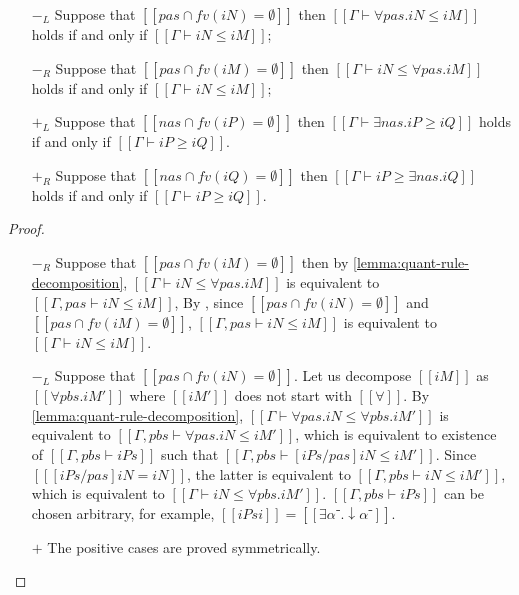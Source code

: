 \begin{corollary}
  \label{corollary:red-quant-elim}
  \hfill
  \begin{itemize}
    \item [$-_{L}$] Suppose that $[[ {pas} ∩ fv(iN) = ∅]]$ then 
      $[[Γ ⊢ ∀pas.iN ≤ iM]]$ holds if and only if $[[Γ ⊢ iN ≤ iM]]$;
    \item [$-_{R}$] Suppose that $[[ {pas} ∩ fv(iM) = ∅]]$ then 
      $[[Γ ⊢ iN ≤ ∀pas.iM]]$ holds if and only if $[[Γ ⊢ iN ≤ iM]]$;
    \item [$+_{L}$] Suppose that $[[ {nas} ∩ fv(iP) = ∅]]$ then
      $[[Γ ⊢ ∃nas.iP ≥ iQ]]$ holds if and only if $[[Γ ⊢ iP ≥ iQ]]$.
    \item [$+_{R}$] Suppose that $[[ {nas} ∩ fv(iQ) = ∅]]$ then 
      $[[Γ ⊢ iP ≥ ∃nas.iQ]]$ holds if and only if $[[Γ ⊢ iP ≥ iQ]]$.
  \end{itemize}
\end{corollary}
\begin{proof}
  \begin{itemize}
    \item [$-_{R}$] Suppose that $[[ {pas} ∩ fv(iM) = ∅]]$ then 
      by \cref{lemma:quant-rule-decomposition},
      $[[Γ ⊢ iN ≤ ∀pas.iM]]$ 
      is equivalent to $[[Γ, pas ⊢ iN ≤ iM]]$,
      By \label{lemma:wf-ctxt-equiv},
      since $[[{pas} ∩ fv(iN) = ∅]]$ and $[[{pas} ∩ fv(iM) = ∅]]$,
      $[[Γ, pas ⊢ iN ≤ iM]]$ is equivalent to $[[Γ ⊢ iN ≤ iM]]$.

    \item [$-_{L}$] Suppose that $[[ {pas} ∩ fv(iN) = ∅]]$.
      Let us decompose $[[iM]]$ as $[[∀pbs.iM']]$ 
      where $[[iM']]$ does not start with $[[∀]]$.
      By \cref{lemma:quant-rule-decomposition},
      $[[Γ ⊢ ∀pas.iN ≤ ∀pbs.iM']]$ is equivalent to
      $[[Γ,pbs ⊢ ∀pas.iN ≤ iM']]$, 
      which is equivalent to 
      existence of $[[Γ,pbs ⊢ iPs]]$ such that 
      $[[Γ,pbs ⊢ [iPs/pas]iN ≤ iM']]$.
      Since $[[ [iPs/pas]iN  = iN]]$, the latter is equivalent to 
      $[[Γ,pbs ⊢ iN ≤ iM']]$,
      which is equivalent to $[[Γ ⊢ iN ≤ ∀pbs.iM']]$.
      $[[Γ,pbs ⊢ iPs]]$ can be chosen arbitrary, for example, $[[iPsi]] = [[∃α⁻.↓α⁻]]$.
    \item [$+$] The positive cases are proved symmetrically.
  \end{itemize}
\end{proof}

